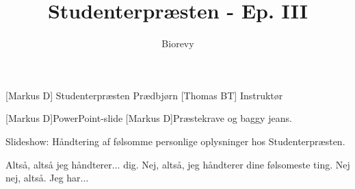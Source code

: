 \documentclass[a4paper,12pt]{article}
\title{Studenterpræsten - Ep. III}
\author{Biorevy}
\begin{document}
\maketitle




\begin{roles}
	[Markus D] Studenterpræsten Prædbjørn
	[Thomas BT] Instruktør
\end{roles}


\begin{props}
	[Markus D]PowerPoint-slide
	[Markus D]Præstekrave og baggy jeans.
\end{props}

\begin{sketch}



 Slideshow: Håndtering af følsomme personlige oplysninger hos Studenterpræsten.

 Altså, altså jeg håndterer... dig. Nej, altså, jeg håndterer dine følsomeste ting. Nej nej, altså. Jeg har...


\end{sketch}
\end{document}
